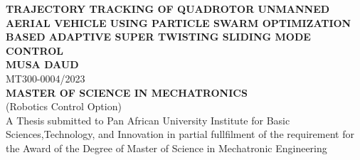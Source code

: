 \documentclass[12pt,a4paper]{report}
\begin{document}
\begin{titlepage}
\centering
\large{\textbf{TRAJECTORY TRACKING OF QUADROTOR UNMANNED AERIAL VEHICLE USING PARTICLE SWARM OPTIMIZATION BASED ADAPTIVE SUPER TWISTING SLIDING MODE CONTROL}}\\
   \vspace{3cm} 
         \centering
 \textbf{MUSA DAUD }\\
       MT300-0004/2023\\
        \vspace{3cm}
    \textbf{ MASTER OF SCIENCE IN MECHATRONICS} \\
        (Robotics Control Option)\\
       \vspace{5cm}
       A Thesis  submitted to Pan African University Institute for Basic Sciences,Technology, and Innovation in partial fullfilment of the requirement for the Award of the Degree of Master of Science in Mechatronic Engineering\\	
	\vspace{1cm}
\\

		\end{titlepage}
		\begin{center}
			\noindent{}
		\end{center}
		
		
		
		
		
\end{document}

